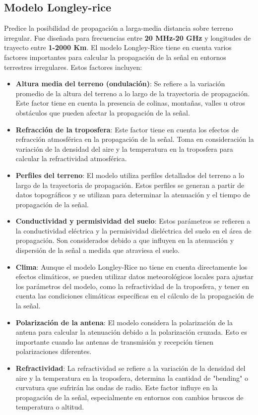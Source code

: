 \documentclass[
	12pt, %
	fleqn, %
	a4paper, %
	oneside, %
]{LegrandOrangeBook}
\begin{document}
\subsection{Modelo Longley-rice}
Predice la posibilidad de propagación a larga-media distancia sobre terreno irregular. Fue diseñada para frecuencias entre \textbf{20 MHz-20 GHz} y longitudes de trayecto entre \textbf{1-2000 Km}. El modelo Longley-Rice tiene en cuenta varios factores importantes para calcular la propagación de la señal en entornos terrestres irregulares. Estos factores incluyen:
\begin{itemize}
\item \textbf{Altura media del terreno (ondulación)}: Se refiere a la variación promedio de la altura del terreno a lo largo de la trayectoria de propagación. Este factor tiene en cuenta la presencia de colinas, montañas, valles u otros obstáculos que pueden afectar la propagación de la señal.

\item \textbf{Refracción de la troposfera}: Este factor tiene en cuenta los efectos de refracción atmosférica en la propagación de la señal. Toma en consideración la variación de la densidad del aire y la temperatura en la troposfera para calcular la refractividad atmosférica.

\item \textbf{Perfiles del terreno}: El modelo utiliza perfiles detallados del terreno a lo largo de la trayectoria de propagación. Estos perfiles se generan a partir de datos topográficos y se utilizan para determinar la atenuación y el tiempo de propagación de la señal.

\item \textbf{Conductividad y permisividad del suelo}: Estos parámetros se refieren a la conductividad eléctrica y la permisividad dieléctrica del suelo en el área de propagación. Son considerados debido a que influyen en la atenuación y dispersión de la señal a medida que atraviesa el suelo.

\item \textbf{Clima}: Aunque el modelo Longley-Rice no tiene en cuenta directamente los efectos climáticos, se pueden utilizar datos meteorológicos locales para ajustar los parámetros del modelo, como la refractividad de la troposfera, y tener en cuenta las condiciones climáticas específicas en el cálculo de la propagación de la señal.

\item \textbf{Polarización de la antena}: El modelo considera la polarización de la antena para calcular la atenuación debido a la polarización cruzada. Esto es importante cuando las antenas de transmisión y recepción tienen polarizaciones diferentes.

\item \textbf{Refractividad}: La refractividad se refiere a la variación de la densidad del aire y la temperatura en la troposfera, determina la cantidad de "bending" o curvatura que sufrirán las ondas de radio. Este factor influye en la propagación de la señal, especialmente en entornos con cambios bruscos de temperatura o altitud.
\end{itemize}
\end{document}
